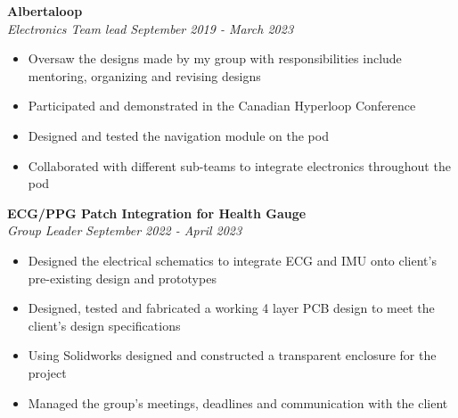 \documentclass[a4paper,20pt]{article}
\begin{document}
    \vspace{-1pt}
        \textbf{Albertaloop}
        \vspace{2pt}
        \textit{}\\
        \textit{Electronics Team lead} \hspace{10.2cm}
        \textit{September 2019 - March 2023}
        \vspace{-5pt} 
        \hspace{-10pt}
    \begin{itemize}
        \item Oversaw the designs made by my group with responsibilities include mentoring, organizing and revising designs \vspace{-5pt}
        \item Participated and demonstrated in the Canadian Hyperloop Conference \vspace{-5pt}
        \item Designed and tested the navigation module on the pod \vspace{-5pt} 
        \item Collaborated with different sub-teams to integrate electronics throughout the pod
    \end{itemize}
    \vspace{-1pt}
        \textbf{ECG/PPG Patch Integration for Health Gauge} \\
        \textit{Group Leader} \hspace{11.5cm}
        \textit{September 2022 - April 2023}
        \vspace{-5pt}
    \begin{itemize}
        \item Designed the electrical schematics to integrate ECG and IMU onto client's pre-existing design and prototypes \vspace{-5pt}
        \item Designed, tested and fabricated a working 4 layer PCB design to meet the client's design specifications \vspace{-5pt}
        \item Using Solidworks designed and constructed a transparent enclosure for the project \vspace{-5pt}
        \item Managed the group's meetings, deadlines and communication with the client
    \end{itemize}
\end{document}
